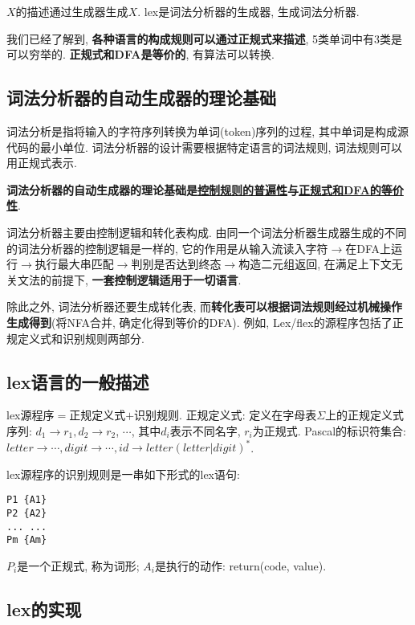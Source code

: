     $X$的描述通过生成器生成$X$. lex是词法分析器的生成器, 生成词法分析器.

    我们已经了解到, \textbf{各种语言的构成规则可以通过正规式来描述}, 5类单词中有3类是可以穷举的. \textbf{正规式和DFA是等价的}, 有算法可以转换.

    \subsection{词法分析器的自动生成器的理论基础}

    \textsf{词法分析}是指将输入的字符序列转换为\textsf{单词}(token)序列的过程, 其中单词是构成源代码的最小单位. 词法分析器的设计需要根据特定语言的词法规则, 词法规则可以用正规式表示.

    \textbf{词法分析器的自动生成器的理论基础是\underline{控制规则的普遍性}与\underline{正规式和DFA的等价性}}.

    \textsf{词法分析器}主要由\textsf{控制逻辑}和\textsf{转化表}构成. 由同一个词法分析器生成器生成的不同的词法分析器的控制逻辑是一样的, 它的作用是从输入流读入字符$\to$在DFA上运行$\to$执行最大串匹配$\to$判别是否达到终态$\to$构造二元组返回, 在满足上下文无关文法的前提下, \textbf{一套控制逻辑适用于一切语言}.

    除此之外, 词法分析器还要生成转化表, 而\textbf{转化表可以根据词法规则经过机械操作生成得到}(将NFA合并, 确定化得到等价的DFA). 例如, Lex/flex的源程序包括了正规定义式和识别规则两部分.

    \subsection{lex语言的一般描述}

        lex源程序$=$正规定义式$+$识别规则. \textsf{正规定义式}: 定义在字母表$\Sigma$上的正规定义式序列: $d_1\to r_1, d_2\to r_2$, $\cdots$, 其中$d_i$表示不同名字, $r_i$为正规式. Pascal的标识符集合: $letter\to \cdots, digit\to \cdots, id\to letter(letter|digit)^*$.

        lex源程序的识别规则是一串如下形式的lex语句:
\begin{verbatim}
P1 {A1}
P2 {A2}
... ...
Pm {Am}
\end{verbatim}

        $P_i$是一个正规式, 称为\textsf{词形}; $A_i$是执行的动作: return(code, value).

    \subsection{lex的实现}

